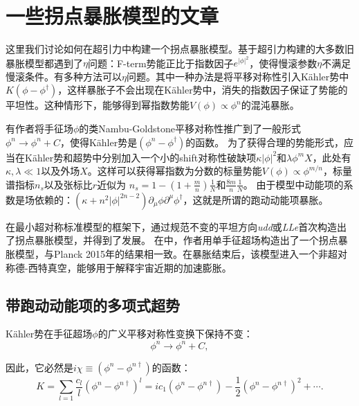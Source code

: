 \section{一些拐点暴胀模型的文章}
这里我们讨论如何在超引力中构建一个拐点暴胀模型。基于超引力构建的大多数旧暴胀模型\citep{freedman1989progress,deser1976consistent,wess1992supersymmetry}都遇到了$\eta$问题\citep{yamaguchi2011supergravity}：F-term势能正比于指数因子$e^{|\phi|^2}$，使得慢滚参数$\eta$不满足慢滚条件。有多种方法可以$\eta$问题\citep{stewart1995inflation,linde1994hybrid,linde1997hybrid,panagiotakopoulos1997hybrid}。其中一种办法是将平移对称性引入K\"ahler势中$K(\phi-\phi^\dagger)$，这样暴胀子不会出现在K\"ahler势中，消失的指数因子保证了势能的平坦性。这种情形下，能够得到幂指数势能$V(\phi)\propto
\phi^n$的混沌暴胀。

有作者\citep{takahashi2010linear,nakayama2010running,kasuya2014flat}将手征场$\phi$的类Nambu-Goldstone平移对称性推广到了一般形式$\phi^n\rightarrow
\phi^n+C$，使得K\"ahler势是$\left(\phi^n-\phi^\dagger\right)$的函数。
为了获得合理的势能形式，应当在K\"{a}hler势和超势中分别加入一个小的shift对称性破缺项$\kappa|\phi|^2$和$\lambda\phi^m
X$，此处有$\kappa,\lambda\ll
1$以及外场$X$。这样可以获得幂指数为分数的标量势能$V(\phi)\propto
\phi^{m/n}$，标量谱指标$n_s$以及张标比$r$近似为
$n_s=1-(1+\frac{m}{n})\frac{1}{N}$和$\frac{8m}{n}\frac{1}{N}$\citep{nakayama2010running}。
由于模型中动能项的系数是场依赖的：$(\kappa+n^2|\phi|^{2n-2})\partial_{\mu}\phi\partial^{\mu}\phi^{\dag}$，这就是所谓的跑动动能项暴胀。

在最小超对称标准模型的框架下，通过规范不变的平坦方向\textit{udd}或\textit{LLe}首次构造出了拐点暴胀模型\citep{allahverdi2006gauge}，并得到了发展\citep{allahverdi2007term,enqvist2010inflection,hotchkiss2012observable,chatterjee2015bound}。
在\citep{gao2015inflection}中，作者用单手征超场构造出了一个拐点暴胀模型，与Planck
2015年的结果相一致。在暴胀结束后，该模型进入一个非超对称德-西特真空，能够用于解释宇宙近期的加速膨胀。

\subsection{带跑动动能项的多项式超势}
K\"ahler势在手征超场$\phi$的广义平移对称性变换下保持不变：
\begin{equation}
    \phi^n \rightarrow \phi^n + C,
\end{equation}

因此，它必然是$i\chi \equiv (\phi^n - \phi^{n\dagger})$的函数：
\begin{equation}
    K = \sum_{l=1}\frac{c_l}{l}{\left(\phi^n-\phi^{n\dagger}\right)}^l
    =
    i c_1(\phi^n-\phi^{n\dagger})-\frac{1}{2}{\left(\phi^n-\phi^{n\dagger}\right)}^2+\cdots.
\end{equation}

